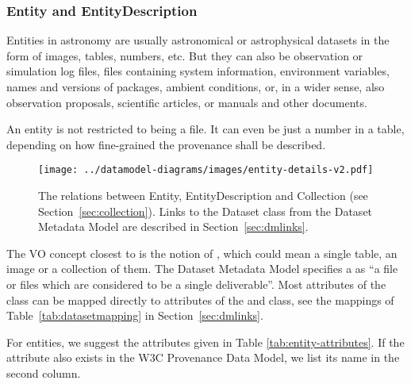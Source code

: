\subsubsection{Entity and EntityDescription}

Entities in astronomy are usually astronomical or astrophysical datasets in the 
form of images, tables, numbers, etc. But they can also be observation or 
simulation log files, files containing system information, environment
variables, names and versions of packages, ambient conditions, or, in a wider
sense, also observation proposals, scientific  articles, or manuals and other
documents. 

An entity is not restricted to being a file. 
It can even be just a number in a table, depending on how fine-grained the 
provenance shall be described.

\begin{figure}[h]
\centering
\texttt{[image: ../datamodel-diagrams/images/entity-details-v2.pdf]}
\caption[Relations between Entity, EntityDescription and Collection]{The relations between Entity, EntityDescription and Collection (see Section~\ref{sec:collection}). 
Links to the Dataset class from the Dataset Metadata Model are described in Section~\ref{sec:dmlinks}.}
\label{fig:entity-details}
\end{figure}

The VO concept closest to  is the notion of , which
could mean a single  table, an image or a collection of them. The Dataset
Metadata Model  \citep{std:DatasetDM} specifies a  as ``a file or
files which  are considered to be a single deliverable''.  Most attributes of
the  class can be mapped directly to attributes of the
 and  class, see the mappings of 
Table~\ref{tab:datasetmapping} in Section~\ref{sec:dmlinks}.


For entities, we suggest the attributes given in Table 
\ref{tab:entity-attributes}. If the attribute also exists in the W3C 
Provenance Data Model, we list its name in the second column.


